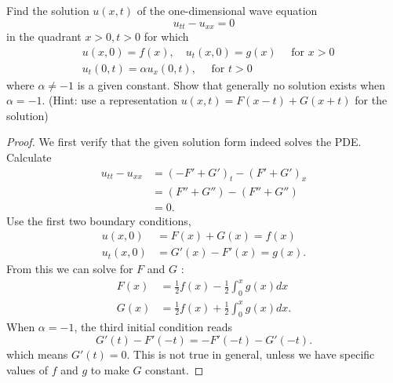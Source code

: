 \begin{problem}
	Find the solution $u(x, t)$ of the one-dimensional wave equation
\[
u_{t t}-u_{x x}=0
\]
in the quadrant $x>0, t>0$ for which
\[
\begin{aligned}
& u(x, 0)=f(x), \quad u_t(x, 0)=g(x) \quad \text { for } x>0 \\
& u_t(0, t)=\alpha u_x(0, t), \quad \text { for } t>0
\end{aligned}
\]
where $\alpha \neq-1$ is a given constant. Show that generally no solution exists when $\alpha=-1$. (Hint: use a representation $u(x, t)=F(x-t)+G(x+t)$ for the solution)
\end{problem}
\begin{proof}
	We first verify that the given solution form indeed solves the PDE. Calculate
	\begin{align*}
		u_{tt}- u_{xx}
		&= \left( -F' + G' \right) _t - \left( F' + G' \right) _x  \\
		&= (F'' + G'') - (F'' + G'') \\
		&= 0
	.\end{align*}
	Use the first two boundary conditions,
	\begin{align*}
		u(x,0) &= F(x) + G(x) = f(x) \\
		u_t(x,0) &= G'(x) - F'(x) = g(x)
	.\end{align*}
	From this we can solve for $F$ and $G$ :
	\begin{align*}
		F(x) &= \frac{1}{2}f(x) - \frac{1}{2} \int _0^x g(x) dx\\
		G(x) &= \frac{1}{2}f(x) + \frac{1}{2} \int _0^x g(x) dx
	.\end{align*}
	When $\alpha = -1$, the third initial condition reads
	\[
		G'(t) - F'(-t) = -F'(-t) - G'(-t)
	.\] 
	which means $G'(t) = 0$. This is not true in general, unless we have specific values of $f$ and $g$ to make $G$ constant.
\end{proof}

